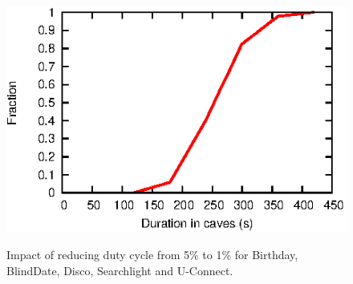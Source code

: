 \documentclass[twoside,twocolumn]{article}
\begin{document}
\begin{figure}[t]
{        \begin{minipage}[b]{0.33\textwidth}
          \centering
	  \includegraphics[scale=0.85]{graphs/one-month-result/cdf_august_duration}
          \label{fig:cdf_duration}
	\end{minipage}}
    \caption{Impact of reducing duty cycle from 5\% to 1\% for
       Birthday, BlindDate, Disco, Searchlight and U-Connect.}
    \label{fig:break-orig}
\end{figure}
\end{document}
